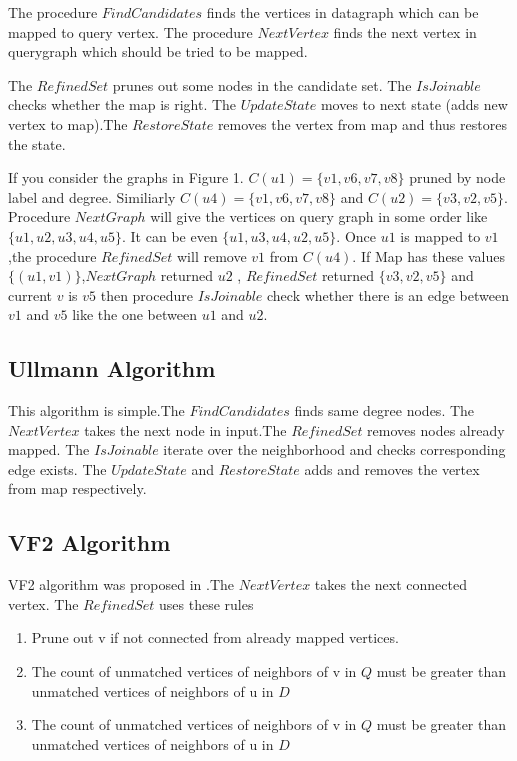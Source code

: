 \hspace{10mm}The procedure $FindCandidates$ finds the vertices in datagraph which can be mapped to query vertex. The procedure $NextVertex$ finds the next vertex in querygraph which should be tried to be mapped.

\hspace{10mm}The $RefinedSet$  prunes out some nodes in the candidate set.  The $ IsJoinable$ checks whether the map is right. The $UpdateState$ moves to next state (adds new vertex to map).The $RestoreState$ removes the vertex from map and thus restores the state.

\hspace{10mm} If you consider the graphs in Figure 1. $C(u1)=\{v1,v6,v7,v8\}$ pruned by node label and degree. Similiarly $C(u4)=\{v1,v6,v7,v8\}$ and $C(u2)=\{v3,v2,v5\}$. Procedure $NextGraph$ will give the vertices on query graph in some order like $\{u1,u2,u3,u4,u5\}$. It can be even $\{ u1, u3,u4,u2,u5\}$. Once $ u1$ is mapped to $v1$,the procedure $RefinedSet$ will remove $v1$ from $C(u4)$. If Map has these values $\{(u1,v1)\}$,$NextGraph$ returned $u2$ , $RefinedSet$ returned $\{v3,v2,v5\}$ and current $v$ is $v5$ then procedure $IsJoinable$ check whether there is an edge between $v1 $ and $v5$ like the one between $u1$ and $u2$.  
\subsection{Ullmann Algorithm}
\label{sec:ullmann}
\hspace{10mm}This algorithm\cite{Ull} is simple.The $FindCandidates$ finds same degree nodes. The $NextVertex$ takes the next node in input.The $RefinedSet$ removes nodes already mapped.  The $ IsJoinable$ iterate over the neighborhood and checks corresponding edge exists. The $UpdateState$ and $RestoreState$ adds and removes the vertex from map respectively.
\subsection{VF2 Algorithm}
\label{sec:vf2}
\hspace{10mm}VF2 algorithm was proposed in \cite{VF2}.The $NextVertex$ takes the next connected vertex. The $RefinedSet$ uses these rules
 \begin{enumerate}
 \item Prune out v if not connected from already mapped vertices.
 \item The count of unmatched vertices of neighbors of v in $Q$ must be greater than unmatched vertices of neighbors of u in $D$
 \item The count of unmatched vertices of neighbors of v in $Q$ must be greater than unmatched vertices of neighbors of u in $D$
 \end{enumerate}
